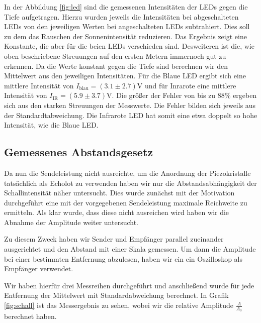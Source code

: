 \documentclass[12pt,a4paper,titlepage,headinclude,bibtotoc]{scrartcl}
\numberwithin{equation}{subsection}
\begin{document}
In der Abbildung \ref{fig:led} sind die gemessenen Intensitäten der LEDs gegen die Tiefe aufgetragen.
Hierzu wurden jeweils die Intensitäten bei abgeschalteten LEDs von den jeweiligen Werten bei angeschalteten LEDs subtrahiert.
Dies soll zu dem das Rauschen der Sonnenintensität reduzieren.%
Das Ergebnis zeigt eine Konstante, die aber für die beien LEDs verschieden sind.
Desweiteren ist die, wie oben beschriebene Streuungen auf den ersten Metern immernoch gut zu erkennen.
Da die Werte konstant gegen die Tiefe sind berechnen wir den Mittelwert aus den jeweiligen Intensitäten.
Für die Blaue LED ergibt sich eine mittlere Intensität von $I_\text{blau}=(3.1\pm2.7)\si{\volt}$ und für Inrarote eine mittlere Intensität von $I_\text{IR}=(5.9\pm3.7)\si{\volt}$.
Die größer der Fehler von bis zu 88\% ergeben sich aus den starken Streuungen der Messwerte.
Die Fehler bilden sich jeweils aus der Standardtabweichung.
Die Infrarote LED hat somit eine etwa doppelt so hohe Intensität, wie die Blaue LED.

\subsection{Gemessenes Abstandsgesetz}
Da nun die Sendeleistung nicht ausreichte, um die Anordnung der Piezokristalle tatsächlich als Echolot zu verwenden haben wir nur die Abstandsabhängigkeit der Schallintensität näher untersucht. 
Dies wurde zunächst mit der Motivation durchgeführt eine mit der vorgegebenen Sendeleistung maximale Reichweite zu ermitteln. Als klar wurde, dass diese nicht ausreichen wird haben wir
die Abnahme der Amplitude weiter untersucht.

Zu diesem Zweck haben wir Sender und Empfänger parallel zueinander ausgerichtet und den Abstand mit einer Skala gemessen. Um dann die Amplitude bei einer bestimmten Entfernung abzulesen, haben wir ein
ein Oszilloskop als Empfänger verwendet.

Wir haben hierfür drei Messreihen durchgeführt und anschließend wurde für jede Entfernung der Mittelwert mit Standardabweichung berechnet. In Grafik \ref{fig:schall} ist das Messergebnis zu sehen, wobei wir die relative Amplitude $\frac{A}{A_0}$ berechnet haben.
\end{document}
